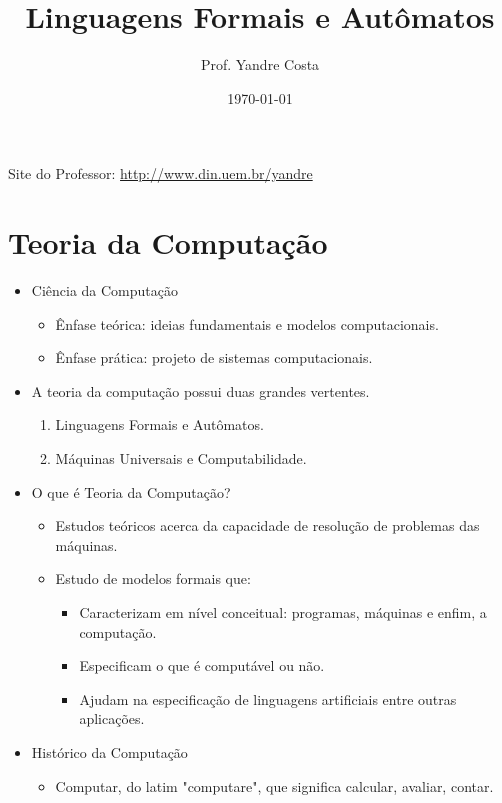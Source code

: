 \documentclass[12pt]{article}
\title{Linguagens Formais e Autômatos}
\author{Prof. Yandre Costa}
\date{\today}
\begin{document}
\maketitle
Site do Professor: \url{http://www.din.uem.br/yandre} 
\section{Teoria da Computação}
\begin{itemize}[label=$\rightarrow$]
    \item Ciência da Computação
    \begin{itemize}
        \item Ênfase teórica: ideias fundamentais e modelos computacionais.
        \item Ênfase prática: projeto de sistemas computacionais.
    \end{itemize}
    \item A teoria da computação possui duas grandes vertentes.
    \begin{enumerate}
        \item Linguagens Formais e Autômatos.
        \item Máquinas Universais e Computabilidade.
    \end{enumerate}
    \item O que é Teoria da Computação?
    \begin{itemize}
        \item Estudos teóricos acerca da capacidade de resolução de problemas 
        das máquinas.
        \item Estudo de modelos formais que:
        \begin{itemize}
            \item Caracterizam em nível conceitual: programas, máquinas e enfim, 
            a computação.
            \item Especificam o que é computável ou não.
            \item Ajudam na especificação de linguagens artificiais entre outras 
            aplicações.
        \end{itemize}
    \end{itemize}
    \item Histórico da Computação
    \begin{itemize}
        \item Computar, do latim "computare", que significa calcular, avaliar, 
        contar.
    \end{itemize}
\end{itemize}
\end{document}
